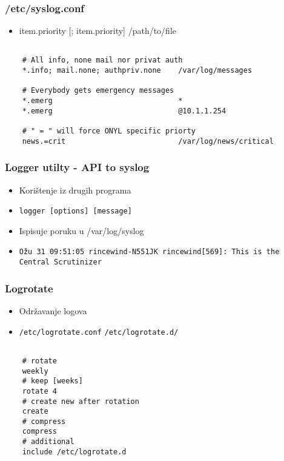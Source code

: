 \documentclass[t,table,usenames,dvipsnames]{beamer}
\newcommand{\shell}[1]{\texttt{#1}}
\begin{document}
\begin{frame}[fragile]
    \frametitle{/etc/syslog.conf}
    \begin{itemize}
        \item item.priority [; item.priority]   /path/to/file
    \end{itemize}
    \begin{verbatim}

    # All info, none mail nor privat auth
    *.info; mail.none; authpriv.none    /var/log/messages

    # Everybody gets emergency messages
    *.emerg                             *
    *.emerg                             @10.1.1.254
    
    # " = " will force ONYL specific priorty
    news.=crit                          /var/log/news/critical

    \end{verbatim}

\end{frame}

\begin{frame}[fragile]
    \frametitle{Logger utilty - API to syslog}

    \begin{itemize}
        \item Korištenje iz drugih programa

        \item \shell{logger [options] [message]}
        \item Ispisuje poruku u /var/log/syslog

        \item \shell{Ožu 31 09:51:05 rincewind-N551JK rincewind[569]: This is the Central Scrutinizer}

    \end{itemize}

\end{frame}

\begin{frame}[fragile]
    \frametitle{Logrotate}
    \begin{itemize}
        \item Održavanje logova
        \item \shell{/etc/logrotate.conf} \shell{/etc/logrotate.d/}
    \end{itemize}

    \begin{verbatim}

    # rotate
    weekly
    # keep [weeks]
    rotate 4
    # create new after rotation
    create
    # compress
    compress
    # additional
    include /etc/logrotate.d

    \end{verbatim}

\end{frame}
\end{document}
